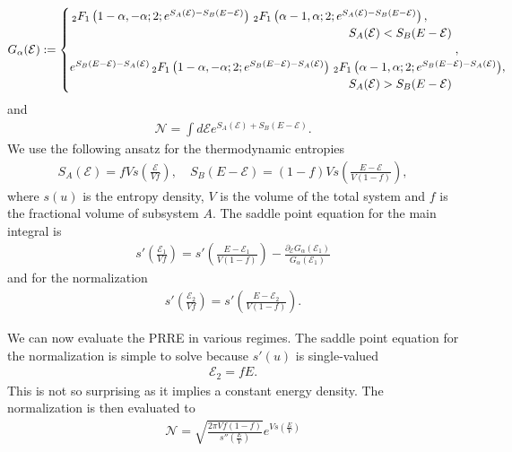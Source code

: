 \documentclass[a4paper,11pt]{article}
\begin{document}
\begin{align}
    G_{\alpha}(\mathcal{E}) := \begin{cases}\, _2F_1\left(1-{\alpha},-{\alpha};2;e^{S_A(\mathcal{E})-S_B(E-\mathcal{E})}\right)
    \,
   _2F_1\left({\alpha}-1,{\alpha};2;e^{S_A(\mathcal{E})-S_B(E-\mathcal{E})}\right), 
       \\& \hspace{-5cm}S_A(\mathcal{E}) < S_B(E-\mathcal{E})
   \\
   \\
   e^{S_B(E-\mathcal{E})-S_A(\mathcal{E})}{ \, _2F_1\left(1-{\alpha},-{\alpha};2;e^{S_B(E-\mathcal{E})-S_A(\mathcal{E})}\right)
     \,
   _2F_1\left({\alpha}-1,{\alpha};2;e^{S_B(E-\mathcal{E})-S_A(\mathcal{E})}\right)} , 
       \\&\hspace{-5cm} S_A(\mathcal{E}) > S_B(E-\mathcal{E})
   \end{cases},
\end{align}
and
\begin{align}
    \mathcal{N} = \int d\mathcal{E}e^{S_A(\mathcal{E})+S_B(E-\mathcal{E})} .
\end{align}
We use the following ansatz for the thermodynamic entropies
\begin{align}
    S_A(\mathcal{E})=fVs\left( \frac{\mathcal{E}}{Vf}\right), \quad  S_B(E-\mathcal{E})=(1-f)Vs\left( \frac{E-\mathcal{E}}{V(1-f)}\right),
\end{align}
where $s(u)$ is the entropy density, $V$ is the volume of the total system and $f$ is the fractional volume of subsystem $A$.
The saddle point equation for the main integral is 
\begin{align}
    s'\left( \frac{\mathcal{E}_1}{Vf}\right) = s'\left( \frac{E-\mathcal{E}_1}{V(1-f)}\right) - \frac{\partial_{\mathcal{E}}G_{\alpha}(\mathcal{E}_1)}{G_{\alpha}(\mathcal{E}_1)}
\end{align}
and for the normalization
\begin{align}
    s'\left( \frac{\mathcal{E}_2}{Vf}\right) = s'\left( \frac{E-\mathcal{E}_2}{V(1-f)}\right).
\end{align}

We can now evaluate the PRRE in various regimes. The saddle point equation for the normalization is simple to solve because $s'(u)$ is single-valued
\begin{align}
    \mathcal{E}_2 = f E.
\end{align}
This is not so surprising as it implies a constant energy density. The normalization is then evaluated to
\begin{align}
    \mathcal{N} = \sqrt{ \frac{2\pi V f(1-f)}{s''\left( \frac{E}{V}\right)}}e^{V s\left( \frac{E}{V}\right)}
\end{align}
\end{document}
